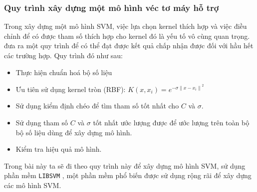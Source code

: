 \subsubsection{Quy trình xây dựng một mô hình véc tơ máy hỗ trợ}

Trong xây dựng một mô hình SVM, việc lựa chọn kernel thích hợp và việc điều chỉnh để có được tham số thích hợp cho kernel đó là yếu tố vô cùng quan trọng. 
\textcite{hsu2003practical} đưa ra một quy trình để có thể đạt được kết quả chấp nhận được đối với hầu hết các trường hợp. Quy trình đó như sau:

\begin{itemize}
  \item Thực hiện chuẩn hoá bộ số liệu
  \item Ưu tiên sử dụng kernel tròn (RBF): $K(x, x_i) = e^{-\sigma{\|x - x_i\|}^2}$
  \item Sử dụng kiểm định chéo để tìm tham số tốt nhất cho $C$ và $\sigma$.
  \item Sử dụng tham số $C$ và $\sigma$ tốt nhất ước lượng được để ước lượng trên toàn bộ bộ số liệu dùng để xây dựng mô hình.
  \item Kiểm tra hiệu quả mô hình.
\end{itemize}

Trong bài này ta sẽ đi theo quy trình này để xây dựng mô hình SVM, sử dụng phần mềm \texttt{LIBSVM} \textcite{CC01a}, một phần mềm phổ biến được sử dụng rộng rãi để xây dựng các mô hình SVM.
